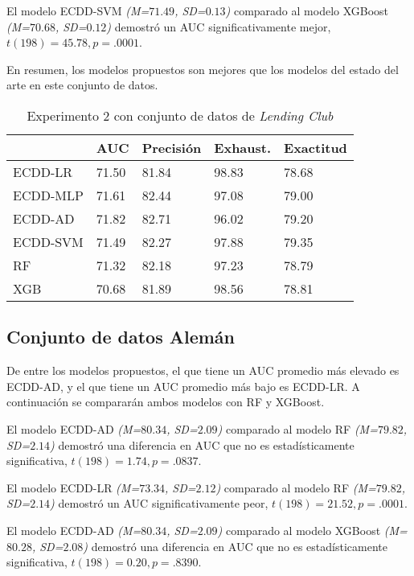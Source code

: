 El modelo ECDD-SVM \textit{(M=$71.49$, SD=$0.13$)} comparado al modelo \ac{XGBoost} \textit{(M=$70.68$, SD=$0.12$)} demostró un \ac{AUC} significativamente mejor, $t(198)=45.78, p=.0001$.

En resumen, los modelos propuestos son mejores que los modelos del estado del arte en este conjunto de datos.

\begin{table}[htbp]
\centering
\caption{Experimento 2 con conjunto de datos de \textit{Lending Club}}
\label{tab:lc-proc2}
\begin{tabularx}{0.75\textwidth}{|l|Y Y Y Y|}
				\hline
				& AUC		& Precisión	& Exhaust.		& Exactitud	\\
				\hline
ECDD-LR			& 71.50		& 81.84		& 98.83			& 78.68		\\		%
ECDD-MLP		& 71.61		& 82.44		& 97.08			& 79.00		\\		%
ECDD-AD			& 71.82		& 82.71		& 96.02			& 79.20		\\		%
ECDD-SVM		& 71.49		& 82.27		& 97.88			& 79.35		\\		%
				\hline
RF				& 71.32		& 82.18		& 97.23			& 78.79		\\		%
XGB				& 70.68		& 81.89		& 98.56			& 78.81		\\		%
				\hline
\end{tabularx}
\end{table}

\subsection{Conjunto de datos Alemán}

De entre los modelos propuestos, el que tiene un \ac{AUC} promedio más elevado es ECDD-AD, y el que tiene un \ac{AUC} promedio más bajo es ECDD-LR. A continuación se compararán ambos modelos con \ac{RF} y \ac{XGBoost}.

El modelo ECDD-AD \textit{(M=$80.34$, SD=$2.09$)} comparado al modelo \ac{RF} \textit{(M=$79.82$, SD=$2.14$)} demostró una diferencia en \ac{AUC} que no es estadísticamente significativa, $t(198)=1.74, p=.0837$.

El modelo ECDD-LR  \textit{(M=$73.34$, SD=$2.12$)} comparado al modelo \ac{RF} \textit{(M=$79.82$, SD=$2.14$)} demostró un \ac{AUC} significativamente peor, $t(198)=21.52, p=.0001$.

El modelo ECDD-AD \textit{(M=$80.34$, SD=$2.09$)} comparado al modelo \ac{XGBoost} \textit{(M=$80.28$, SD=$2.08$)} demostró una diferencia en \ac{AUC} que no es estadísticamente significativa, $t(198)=0.20, p=.8390$.

